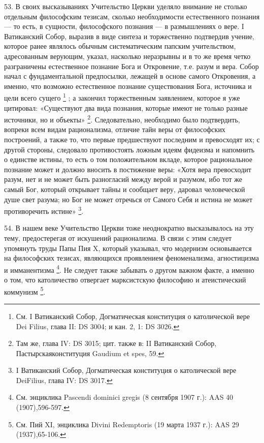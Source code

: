 \documentclass[a5paper,10pt]{article}
\begin{document}
53. В своих высказываниях Учительство Церкви уделяло внимание не столько
отдельным философским тезисам, сколько необходимости естественного познания —
то есть, в сущности, философского познания — в размышлениях о вере. I
Ватиканский Собор, выразив в виде синтеза и торжественно подтвердив учение,
которое ранее являлось обычным систематическим папским учительством,
адресованным верующим, указал, насколько неразрывны и в то же время четко
разграничены естественное познание Бога и Откровение, т.е. разум и вера. Собор
начал с фундаментальной предпосылки, лежащей в основе самого Откровения, а
именно, что возможно естественное познание существования Бога, источника и цели
всего сущего  \footnote{См. I Ватиканский Собор, Догматическая конституция о
католической вере Dei Filius, глава II: DS 3004; и кан. 2, 1: DS 3026.} ; а
закончил торжественным заявлением, которое я уже цитировал: «Существуют два
вида познания, которые имеют не только разные источники, но и объекты»
\footnote{Там же, глава IV: DS 3015; цит. также в: II Ватиканский Собор,
Пастырскаяконституция Gaudium et spes, 59.}.  Следовательно, необходимо было
подтвердить, вопреки всем видам рационализма, отличие тайн веры от философских
построений, а также то, что первые предшествуют последним и превосходят их; с
другой стороны, следовало противостоять ложным идеям фидеизма и напомнить о
единстве истины, то есть о том положительном вкладе, которое рациональное
познание может и должно вносить в постижение веры: «Хотя вера превосходит
разум, нет и не может быть разногласий между верой и разумом, ибо тот же самый
Бог, который открывает тайны и сообщает веру, даровал человеческой душе свет
разума; но Бог не может отречься от Самого Себя и истина не может противоречить
истине»  \footnote{I Ватиканский Собор, Догматическая конституция о
католической вере DeiFilius, глава IV: DS 3017.}.

54. В нашем веке Учительство Церкви тоже неоднократно высказывалось на эту
тему, предостерегая от искушений рационализма. В связи с этим следует упомянуть
труды Папы Пия X, который указывал, что модернизм основывается на философских
тезисах, являющихся проявлением феноменализма, агностицизма и имманентизма
\footnote{См. энциклика Pascendi dominici gregis (8 сентября 1907 г.): AAS 40
(1907),596-597.}.  Не следует также забывать о другом важном факте, а именно о
том, что католичество отвергает марксистскую философию и атеистический
коммунизм  \footnote{См. Пий XI, энциклика Divini Redemptoris (19 марта 1937
г.): AAS 29 (1937),65-106.}.
\end{document}
